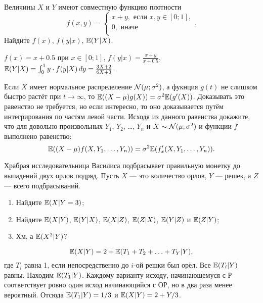 \begin{problem}
Величины $X$ и $Y$ имеют совместную функцию плотности
\[
f(x, y) = \begin{cases}
x+y, \text{ если } x, y \in [0; 1], \\
0, \text{ иначе } \\
\end{cases}.
\]
Найдите $f(x)$, $f(y|x)$, $\mathbb{E}(Y|X)$.
\begin{sol}
  $f(x)=x+0.5$ при $x\in[0; 1]$, $f(y|x) = \frac{x+y}{x+0.5}$, $\mathbb{E}(Y|X) = \int_0^1 y \cdot f(y|X) \, dy = \frac{3X+2}{6X+3}$.
\end{sol}
\end{problem}


\begin{problem}
  Если $X$ имеет нормальное распределение $\mathcal{N}(\mu;\sigma^2)$, а фукнция $g(t)$ не слишком быстро растёт при $t\to\infty$, то $\mathbb{E}((X-\mu)g(X))=\sigma^2\mathbb{E}(g'(X))$. Доказывать это равенство не требуется, но если интересно, то оно доказывается путём интегрирования по частям левой части. Исходя из данного равенства докажите, что для довольно произвольных $Y_1$, $Y_2$, \ldots, $Y_n$ и $X\sim \mathcal{N}(\mu;\sigma^2)$ и функции $f$ выполнено равенство:
  \[
   \mathbb{E}((X-\mu)f(X, Y_1, \ldots, Y_n))=\sigma^2 \mathbb{E}(f'_x(X, Y_1, \ldots, Y_n)).
  \]
\begin{sol}
\end{sol}
\end{problem}


\begin{problem}
Храбрая исследовательница Василиса подбрасывает правильную монетку до выпадений двух орлов подряд. Пусть $X$ — это количество орлов, $Y$ — решек, а $Z$ — всего подбрасываний. 
\begin{enumerate}
\item Найдите $\mathbb{E}(X|Y=3)$;
\item Найдите $\mathbb{E}(X|Y)$, $\mathbb{E}(Y|X)$, $\mathbb{E}(X|Z)$, $\mathbb{E}(Z|X)$, $\mathbb{E}(Y|Z)$ и $\mathbb{E}(Z|Y)$;
\item Хм, а $\mathbb{E}(X^2|Y)$?
\end{enumerate}
\begin{sol}
\[
	\mathbb{E}(X|Y) = 2 + \mathbb{E}(T_1 + T_2 + \ldots + T_Y | Y),
\]
где $T_i$ равна 1, если непосредственно до $i$-ой решки был орёл. Все $\mathbb{E}(T_i |Y)$ равны. Находим $\mathbb{E}(T_1 |Y)$. Каждому варианту исходу, начинающемуся с Р соответствует ровно один исход начинающийся с ОР, но в два раза менее вероятный. Отсюда $\mathbb{E}(T_1 | Y) = 1/3$ и $\mathbb{E}(X|Y) = 2 + Y/3$.
\end{sol}
\end{problem}

